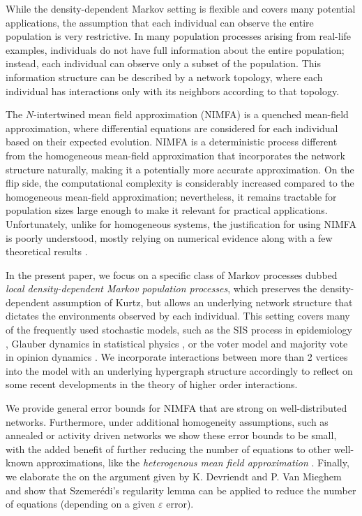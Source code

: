 \documentclass{article}
\newcommand{\1}[1]{{\mathds{1}}_{\left\{#1\right\}}}
\begin{document}
	While the density-dependent Markov setting is flexible and covers many potential applications, the assumption that each individual can observe the entire population is very restrictive. In many population processes arising from real-life examples, individuals do not have full information about the entire population; instead, each individual can observe only a subset of the population. This information structure can be described by a network topology, where each individual has interactions only with its neighbors according to that topology.
	
	The $N$-intertwined mean field approximation (NIMFA) \cite{NIMFA2011} is a quenched mean-field approximation, where differential equations are considered for each individual based on their expected evolution. NIMFA is a deterministic process different from the homogeneous mean-field approximation that incorporates the network structure naturally, making it a potentially more accurate approximation. On the flip side, the computational complexity is considerably increased compared to the homogeneous mean-field approximation; nevertheless, it remains tractable for population sizes large enough to make it relevant for practical applications. Unfortunately, unlike for homogeneous systems, the justification for using NIMFA is poorly understood, mostly relying on numerical evidence \cite{NIMFA_accuracy,NIMFA_accuracy2} along with a few theoretical results \cite{simon2017NIMFA,Sridhar_Kar1, Sridhar_Kar2,age_structured}.
	
	In the present paper, we focus on a specific class of Markov processes dubbed \emph{local density-dependent Markov population processes}, which preserves the density-dependent assumption of Kurtz, but allows an underlying network structure that dictates the environments observed by each individual. This setting covers many of the frequently used stochastic models, such as the SIS process in epidemiology \cite{simplicial1, simplicial2, simplicial3, simplicial4}, Glauber dynamics in statistical physics \cite{Glauber_original,Glauber_ODE}, or the voter model and majority vote in opinion dynamics \cite{voter_majority,voter_adaptive}.   We incorporate interactions between more than 2 vertices into the model with an underlying hypergraph structure accordingly to reflect on some recent developments in the theory of higher order interactions.  
	
	We provide general error bounds for NIMFA that are strong on well-distributed networks. Furthermore, under additional homogeneity assumptions, such as annealed or activity driven networks \cite{annealed, activity1} we show these error bounds to be small, with the added benefit of further reducing the number of equations to other well-known approximations, like the \emph{heterogenous mean field approximation} \cite{vesp}. Finally, we elaborate the on the argument given by K. Devriendt and P. Van Mieghem \cite{unified_meanfield} and show that Szemer\'edi's regularity lemma \cite{Szemeredi} can be applied to reduce the number of equations (depending on a given $\varepsilon$ error).
	
\end{document}
